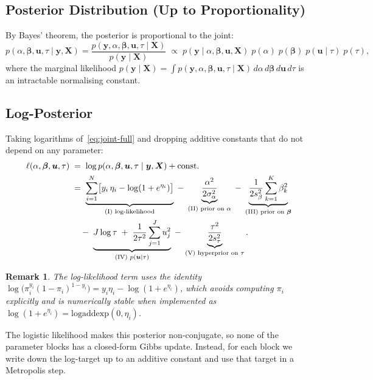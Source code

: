\documentclass[10pt]{article}
\newcommand{\bX}{\bm{X}}
\newcommand{\by}{\bm{y}}
\newcommand{\bbeta}{\bm{\beta}}
\newcommand{\bu}{\bm{u}}
\newtheorem{remark}{Remark}
\begin{document}
\subsection{Posterior Distribution (Up to Proportionality)}

By Bayes' theorem, the posterior is proportional to the joint:
\begin{equation}\label{eq:posterior}
  p(\alpha,\bbeta,\bu,\tau \mid \by, \bX)
  = \frac{p(\by,\alpha,\bbeta,\bu,\tau \mid \bX)}{p(\by \mid \bX)}
  \;\propto\;
  p(\by \mid \alpha,\bbeta,\bu,\bX)\;
  p(\alpha)\;p(\bbeta)\;p(\bu\mid\tau)\;p(\tau),
\end{equation}
where the marginal likelihood $p(\by \mid \bX) = \int p(\by,\alpha,\bbeta,\bu,\tau \mid \bX)\,d\alpha\,d\bbeta\,d\bu\,d\tau$ is an intractable normalising constant.

\subsection{Log-Posterior}

Taking logarithms of~\eqref{eq:joint-full} and dropping additive constants
that do not depend on any parameter:
\begin{align}
  \ell(\alpha,\bbeta,\bu,\tau)
  &\;=\; \log p(\alpha,\bbeta,\bu,\tau \mid \by,\bX) + \text{const.} \notag\\
  &\;=\;
  \underbrace{\sum_{i=1}^{N}
    \bigl[y_i\,\eta_i - \log(1+e^{\eta_i})\bigr]}_{\text{(I) log-likelihood}}
  \;-\;
  \underbrace{\frac{\alpha^2}{2\sigma_\alpha^2}}_{\text{(II) prior on }\alpha}
  \;-\;
  \underbrace{\frac{1}{2s_\beta^2}\sum_{k=1}^{K}\beta_k^2}_{\text{(III) prior on }\bbeta}
  \notag\\
  &\quad\;-\;
  \underbrace{J\log\tau \;+\;
  \frac{1}{2\tau^2}\sum_{j=1}^{J}u_j^2}_{\text{(IV) }p(\bu\mid\tau)}
  \;-\;
  \underbrace{\frac{\tau^2}{2s_\tau^2}}_{\text{(V) hyperprior on }\tau}.
  \label{eq:logpost}
\end{align}

\begin{remark}
The log-likelihood term uses the identity
$\log\bigl(\pi_i^{y_i}(1-\pi_i)^{1-y_i}\bigr) = y_i\eta_i - \log(1+e^{\eta_i})$,
which avoids computing $\pi_i$ explicitly and is numerically stable
when implemented as $\log(1+e^{\eta_i}) = \mathrm{logaddexp}(0,\eta_i)$.
\end{remark}

The logistic likelihood makes this posterior non-conjugate, so none of the
parameter blocks has a closed-form Gibbs update.  Instead, for each block we
write down the log-target up to an additive constant and use that target in a
Metropolis step.
\end{document}
